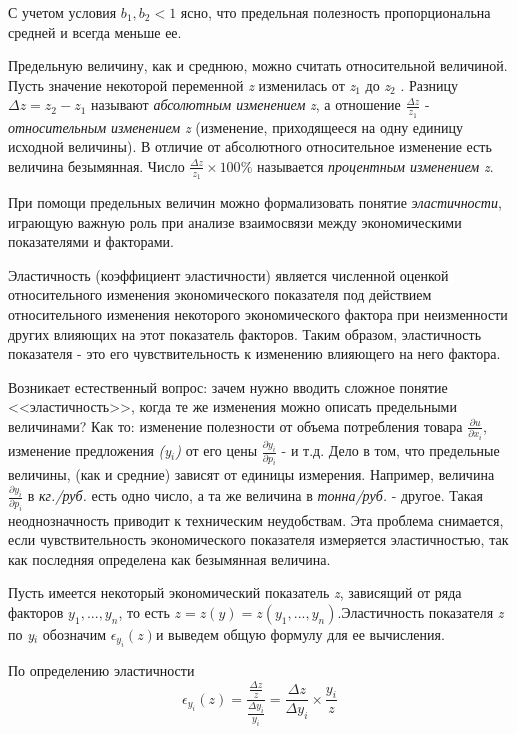\documentclass[12pt, 4paper]{book}
\begin{document}
{\begin{center}
\end{center}
\par
С учетом условия $b_{1},b_{2}< 1$ ясно, что предельная полезность пропорциональна средней и всегда меньше ее. 
\par
Предельную величину, как и среднюю, можно считать относительной величиной. Пусть значение некоторой переменной \textit{z} изменилась от \textit{z${}_{1}$} до \textit{z${}_{2}$} . Разницу $\Delta z = z_{2}- z_{1} $ называют \textit{абсолютным изменением} \textit{z}, а отношение $\frac{\Delta z}{z_{1}}$ - \textit{относительным изменением} \textit{z} (изменение, приходящееся на одну единицу исходной величины). В отличие от абсолютного относительное изменение есть величина безымянная. Число $\frac{\Delta z}{z_{1}} \times 100\% $ называется \textit{процентным изменением} \textit{z}.
\par
При помощи предельных величин можно формализовать понятие \textit{эластичности}, играющую важную роль при анализе взаимосвязи между экономическими показателями и факторами.
\par
Эластичность (коэффициент эластичности) является численной оценкой относительного изменения экономического показателя под действием относительного изменения некоторого экономического фактора при неизменности других влияющих на этот показатель факторов. Таким образом, эластичность показателя - это его чувствительность к изменению влияющего на него фактора.
\par
Возникает естественный вопрос: зачем нужно вводить сложное понятие <<эластичность>>, когда те же изменения можно описать предельными величинами? Как то: изменение полезности от объема потребления товара $\frac{\partial u}{\partial x_{i}}$, изменение предложения \textit{(y${}_{i}$)} от его цены $\frac{\partial y_i}{\partial p_i}$ - и т.д. Дело в том, что предельные величины, (как и средние) зависят от единицы измерения. Например, величина $\frac{\partial y_i}{\partial p_i}$ в \textit{кг./руб.} есть одно число, а та же величина в \textit{тонна/руб.} - другое. Такая неоднозначность приводит к техническим неудобствам. Эта проблема снимается, если чувствительность экономического показателя измеряется эластичностью, так как последняя определена как безымянная величина.
\par
Пусть имеется некоторый экономический показатель \textit{z}, зависящий от ряда факторов $y_{1},...,y_n$, то есть $z=z(y)=z(y_1,...,y_n)$.Эластичность показателя \textit{z} по \textit{y${}_{i}$} обозначим $\epsilon_{y_{i}}(z)$и выведем общую формулу для ее вычисления.
\par
По определению эластичности
\begin{equation}
\label{formula12}
\epsilon_{y_{i}}(z)=\frac{\frac{\Delta z}{z}}{\frac{\Delta y_i}{y_i}}=\frac{\Delta z }{\Delta y_i} \times \frac{y_i}{z}
\end{equation}
\par

}
\end{document}
